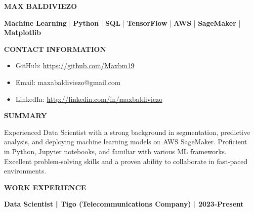 \documentclass[10pt, letterpaper]{article}
\begin{document}
\begin{center}
\textbf{\Large MAX BALDIVIEZO}\\
\end{center}

\begin{center}
\textbf{Machine Learning} | \textbf{Python} | \textbf{SQL} | \textbf{TensorFlow} | \textbf{AWS} | \textbf{SageMaker} | \textbf{Matplotlib}
\end{center}

\vspace{0.2cm}

\begin{flushleft}
\textbf{CONTACT INFORMATION}
\end{flushleft}

\begin{itemize}[noitemsep]
\item[] GitHub: \url{https://github.com/Maxbm19}
\item[] Email: maxabaldiviezo@gmail.com
\item[] LinkedIn: \url{http://linkedin.com/in/maxbaldiviezo}
\end{itemize}

\vspace{0.2cm}

\begin{flushleft}
\textbf{SUMMARY}
\end{flushleft}

Experienced Data Scientist with a strong background in segmentation, predictive analysis, and deploying machine learning models on AWS SageMaker. Proficient in Python, Jupyter notebooks, and familiar with various ML frameworks. Excellent problem-solving skills and a proven ability to collaborate in fast-paced environments.

\vspace{0.2cm}

\begin{flushleft}
\textbf{WORK EXPERIENCE}
\end{flushleft}

\textbf{Data Scientist | Tigo (Telecommunications Company) | 2023-Present}
\end{document}
